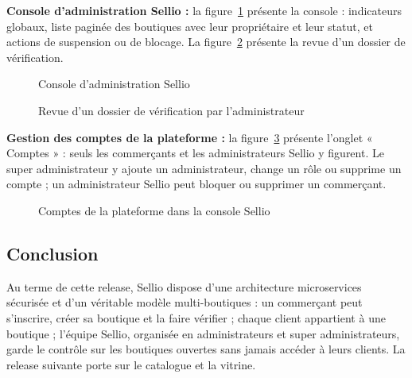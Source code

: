 \textbf{Console d'administration Sellio :} la figure~\ref{fig:ui-console} présente la console : indicateurs globaux, liste paginée des boutiques avec leur propriétaire et leur statut, et actions de suspension ou de blocage. La figure~\ref{fig:ui-verif} présente la revue d'un dossier de vérification.
\begin{figure}[H]
    \centering
    \caption{Console d'administration Sellio}
    \label{fig:ui-console}
\end{figure}
\begin{figure}[H]
    \centering
    \caption{Revue d'un dossier de vérification par l'administrateur}
    \label{fig:ui-verif}
\end{figure}

\textbf{Gestion des comptes de la plateforme :} la figure~\ref{fig:ui-comptes} présente l'onglet « Comptes » : seuls les commerçants et les administrateurs Sellio y figurent. Le super administrateur y ajoute un administrateur, change un rôle ou supprime un compte ; un administrateur Sellio peut bloquer ou supprimer un commerçant.
\begin{figure}[H]
    \centering
    \caption{Comptes de la plateforme dans la console Sellio}
    \label{fig:ui-comptes}
\end{figure}

\subsection*{Conclusion}
Au terme de cette release, Sellio dispose d'une architecture microservices sécurisée et d'un véritable modèle multi-boutiques : un commerçant peut s'inscrire, créer sa boutique et la faire vérifier ; chaque client appartient à une boutique ; l'équipe Sellio, organisée en administrateurs et super administrateurs, garde le contrôle sur les boutiques ouvertes sans jamais accéder à leurs clients. La release suivante porte sur le catalogue et la vitrine.
